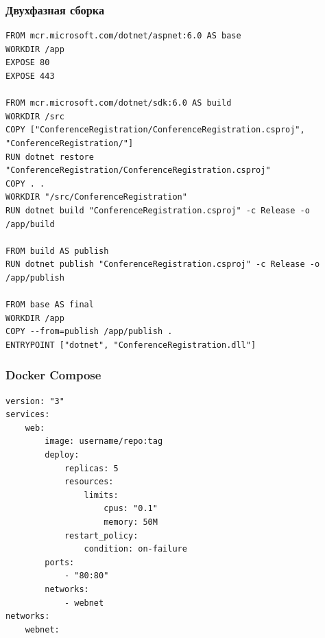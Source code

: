 \documentclass{../../slides-style}
\begin{document}
    \begin{frame}[fragile]
        \frametitle{Двухфазная сборка}
        \begin{scriptsize}
            \begin{verbatim}
FROM mcr.microsoft.com/dotnet/aspnet:6.0 AS base
WORKDIR /app
EXPOSE 80
EXPOSE 443

FROM mcr.microsoft.com/dotnet/sdk:6.0 AS build
WORKDIR /src
COPY ["ConferenceRegistration/ConferenceRegistration.csproj", "ConferenceRegistration/"]
RUN dotnet restore "ConferenceRegistration/ConferenceRegistration.csproj"
COPY . .
WORKDIR "/src/ConferenceRegistration"
RUN dotnet build "ConferenceRegistration.csproj" -c Release -o /app/build

FROM build AS publish
RUN dotnet publish "ConferenceRegistration.csproj" -c Release -o /app/publish

FROM base AS final
WORKDIR /app
COPY --from=publish /app/publish .
ENTRYPOINT ["dotnet", "ConferenceRegistration.dll"]
            \end{verbatim}
        \end{scriptsize}
    \end{frame}

    \begin{frame}[fragile]
        \frametitle{Docker Compose}
        \begin{scriptsize}
            \begin{verbatim}
version: "3"
services:
    web:
        image: username/repo:tag
        deploy:
            replicas: 5
            resources:
                limits:
                    cpus: "0.1"
                    memory: 50M
            restart_policy:
                condition: on-failure
        ports:
            - "80:80"
        networks:
            - webnet
networks:
    webnet:
            \end{verbatim}
        \end{scriptsize}
    \end{frame}
\end{document}

